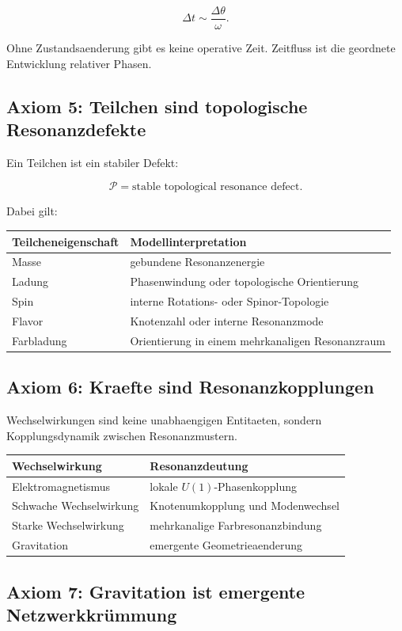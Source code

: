 \documentclass[11pt,a4paper]{article}
\begin{document}
\[
\Delta t \sim \frac{\Delta \theta}{\omega}.
\]

Ohne Zustandsaenderung gibt es keine operative Zeit. Zeitfluss ist die geordnete Entwicklung relativer Phasen.

\subsection{Axiom 5: Teilchen sind topologische Resonanzdefekte}

Ein Teilchen ist ein stabiler Defekt:

\[
\mathcal{P} = \text{stable topological resonance defect}.
\]

Dabei gilt:
\begin{longtable}{>{\raggedright\arraybackslash}p{4cm}p{9cm}}
\toprule
Teilcheneigenschaft & Modellinterpretation \\
\midrule
Masse & gebundene Resonanzenergie \\
Ladung & Phasenwindung oder topologische Orientierung \\
Spin & interne Rotations- oder Spinor-Topologie \\
Flavor & Knotenzahl oder interne Resonanzmode \\
Farbladung & Orientierung in einem mehrkanaligen Resonanzraum \\
\bottomrule
\end{longtable}

\subsection{Axiom 6: Kraefte sind Resonanzkopplungen}

Wechselwirkungen sind keine unabhaengigen Entitaeten, sondern Kopplungsdynamik zwischen Resonanzmustern.

\begin{longtable}{>{\raggedright\arraybackslash}p{4cm}p{9cm}}
\toprule
Wechselwirkung & Resonanzdeutung \\
\midrule
Elektromagnetismus & lokale $U(1)$-Phasenkopplung \\
Schwache Wechselwirkung & Knotenumkopplung und Modenwechsel \\
Starke Wechselwirkung & mehrkanalige Farbresonanzbindung \\
Gravitation & emergente Geometrieaenderung \\
\bottomrule
\end{longtable}

\subsection{Axiom 7: Gravitation ist emergente Netzwerkkrümmung}
\end{document}
